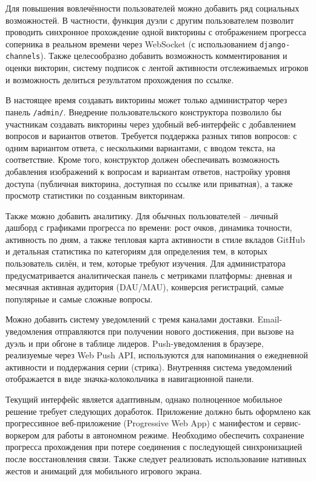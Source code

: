 \documentclass[14pt,a4paper]{extreport}
\begin{document}
Для повышения вовлечённости пользователей можно добавить ряд социальных возможностей. В частности, функция дуэли с другим пользователем позволит проводить синхронное прохождение одной викторины с отображением прогресса соперника в реальном времени через WebSocket (с использованием \texttt{django-channels}). Также целесообразно добавить возможность комментирования и оценки викторин, систему подписок с лентой активности отслеживаемых игроков и возможность делиться результатом прохождения по ссылке.

В настоящее время создавать викторины может только администратор через панель \texttt{/admin/}. Внедрение пользовательского конструктора позволило бы участникам создавать викторины через удобный веб-интерфейс с добавлением вопросов и вариантов ответов. Требуется поддержка разных типов вопросов: с одним вариантом ответа, с несколькими вариантами, с вводом текста, на соответствие. Кроме того, конструктор должен обеспечивать возможность добавления изображений к вопросам и вариантам ответов, настройку уровня доступа (публичная викторина, доступная по ссылке или приватная), а также просмотр статистики по созданным викторинам.

Также можно добавить аналитику. Для обычных пользователей -- личный дашборд с графиками прогресса по времени: рост очков, динамика точности, активность по дням, а также тепловая карта активности в стиле вкладов GitHub и детальная статистика по категориям для определения тем, в которых пользователь силён, и тем, которые требуют изучения. Для администратора предусматривается аналитическая панель с метриками платформы: дневная и месячная активная аудитория (DAU/MAU), конверсия регистраций, самые популярные и самые сложные вопросы.

Можно добавить систему уведомлений с тремя каналами доставки. Email-уведомления отправляются при получении нового достижения, при вызове на дуэль и при обгоне в таблице лидеров. Push-уведомления в браузере, реализуемые через Web Push API, используются для напоминания о ежедневной активности и поддержания серии (стрика). Внутренняя система уведомлений отображается в виде значка-колокольчика в навигационной панели.

Текущий интерфейс является адаптивным, однако полноценное мобильное решение требует следующих доработок. Приложение должно быть оформлено как прогрессивное веб-приложение (Progressive Web App) с манифестом и сервис-воркером для работы в автономном режиме. Необходимо обеспечить сохранение прогресса прохождения при потере соединения с последующей синхронизацией после восстановления связи. Также следует реализовать использование нативных жестов и анимаций для мобильного игрового экрана.
\end{document}
